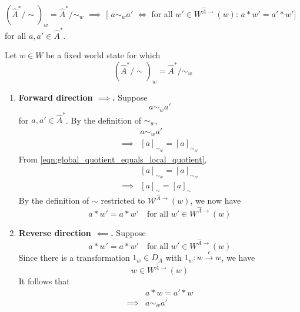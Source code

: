 \begin{lemmaE}
    \label{lem:local_and_global_quotients_effect}
    $(\hat{A}^{*}/\sim)_{w} = \hat{A}^{*}/\sim_{w}$ $\implies$ [ $a \sim_{w} a'$ $\iff$ for all $w' \in W^{\hat{A}\to}(w)$: $a \ast w' = a' \ast w'$] for all $a,a' \in \hat{A}^{*}$.
\end{lemmaE}
\begin{proofE}
    Let $w \in W$ be a fixed world state for which
    \begin{equation}\label{eqn:global_quotient_equals_local_quotient}
        (\hat{A}^{*}/\sim)_{w} = \hat{A}^{*}/\sim_{w}
    \end{equation}
    \begin{enumerate}
        \item \textbf{Forward direction $\implies$.}
        Suppose
        \begin{equation}
            a \sim_{w} a'
        \end{equation}
        for $a, a' \in \hat{A}^{*}$.
        By the definition of $\sim_{w}$,
        \begin{align}
            & a \sim_{w} a' \\
            \implies & [a]_{\sim_{w}} = [a]_{\sim_{w}} 
        \end{align}
        From \cref{eqn:global_quotient_equals_local_quotient},
        \begin{align}
            & [a]_{\sim_{w}} = [a]_{\sim_{w}} \\
            \implies & [a]_{\sim} = [a]_{\sim}
        \end{align}
        By the definition of $\sim$ restricted to $\mathscr{W}^{\hat{A}\to}(w)$, we now have
        \begin{equation}
            a \ast w' = a \ast w' \quad \text{for all $w' \in W^{\hat{A}\to}(w)$}
        \end{equation}

        \item \textbf{Reverse direction $\impliedby$.}
        Suppose
        \begin{equation}
            a \ast w' = a \ast w' \quad \text{for all $w' \in W^{\hat{A}\to}(w)$}
        \end{equation}
        Since there is a transformation $1_{w} \in D_{A}$ with $1_{w}: w \xrightarrow{\epsilon} w$, we have
        \begin{equation}
            w \in W^{\hat{A}\to}(w)
        \end{equation}
        It follows that
        \begin{align}
            & a \ast w = a' \ast w \\
            \implies & a \sim_{w} a'
        \end{align}
    \end{enumerate}
\end{proofE}


